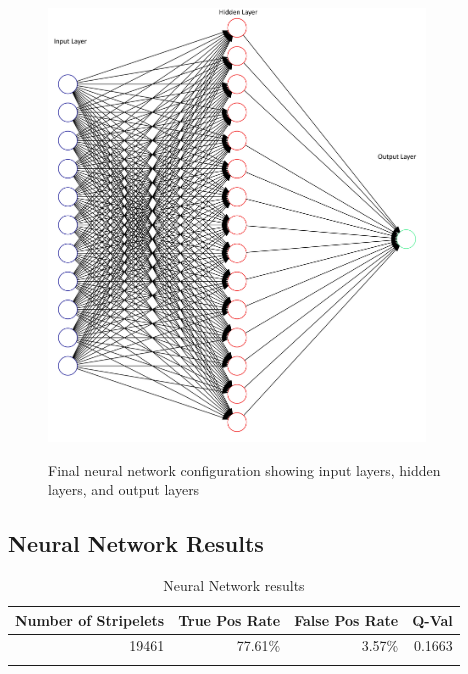 \documentclass[12pt]{ucthesis}
\newcommand{\captionfonts}{\small\bf\ssp}
\begin{document}
\begin{figure}[ht]
\begin{center}
\includegraphics[width=10cm]{ChosenNN2.png}
\captionfonts
\caption[Final Neural Network Configuration]{Final neural network configuration showing input layers, hidden layers, and output layers}
\label{fig:Neural1png}
\end{center}
\end{figure}

\subsection{Neural Network Results}

    \begin{table}[t]
        \begin{longtable}{|r|r|r|r|}
        \hline
        Number of Stripelets & True Pos Rate & False Pos Rate & Q-Val \bigstrut\\
        \hline
        19461 & 77.61\% & 3.57\% & 0.1663 \bigstrut\\
        \hline
    
        \caption{Neural Network results}
        \label{tab:nnresultsoverall} 
        \end{longtable}
    \end{table}
\end{document}
